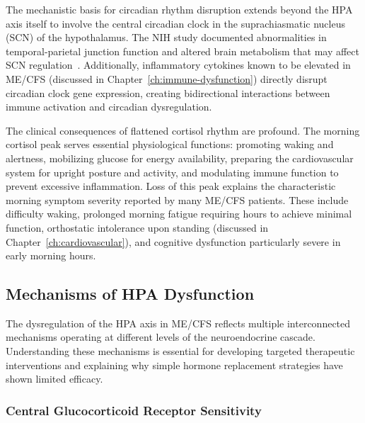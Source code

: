 The mechanistic basis for circadian rhythm disruption extends beyond the HPA axis itself to involve the central circadian clock in the suprachiasmatic nucleus (SCN) of the hypothalamus. The NIH study documented abnormalities in temporal-parietal junction function and altered brain metabolism that may affect SCN regulation~\cite{walitt2024deep}. Additionally, inflammatory cytokines known to be elevated in ME/CFS (discussed in Chapter~\ref{ch:immune-dysfunction}) directly disrupt circadian clock gene expression, creating bidirectional interactions between immune activation and circadian dysregulation.

The clinical consequences of flattened cortisol rhythm are profound. The morning cortisol peak serves essential physiological functions: promoting waking and alertness, mobilizing glucose for energy availability, preparing the cardiovascular system for upright posture and activity, and modulating immune function to prevent excessive inflammation. Loss of this peak explains the characteristic morning symptom severity reported by many ME/CFS patients. These include difficulty waking, prolonged morning fatigue requiring hours to achieve minimal function, orthostatic intolerance upon standing (discussed in Chapter~\ref{ch:cardiovascular}), and cognitive dysfunction particularly severe in early morning hours.

\subsection{Mechanisms of HPA Dysfunction}

The dysregulation of the HPA axis in ME/CFS reflects multiple interconnected mechanisms operating at different levels of the neuroendocrine cascade. Understanding these mechanisms is essential for developing targeted therapeutic interventions and explaining why simple hormone replacement strategies have shown limited efficacy.

\subsubsection{Central Glucocorticoid Receptor Sensitivity}

